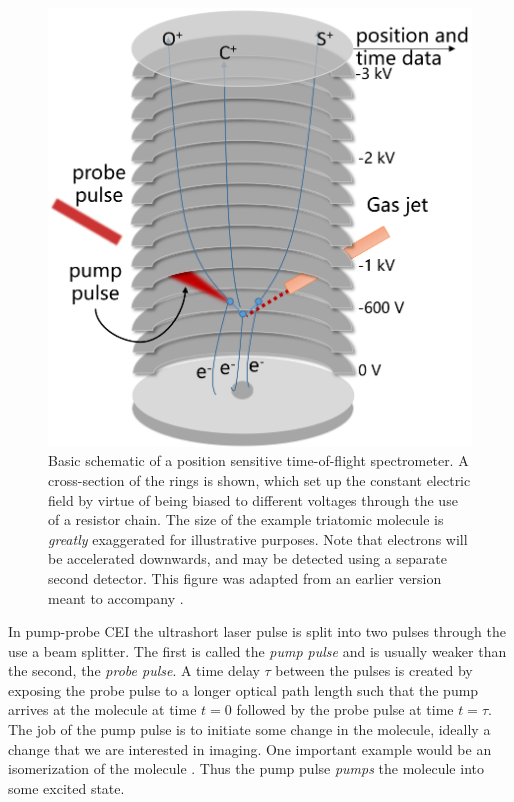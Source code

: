 \begin{figure}
  \centering
  \includegraphics[width=\textwidth]{gfx/SpectrometerLaser}
  \caption[Basic schematic of a position sensitive time-of-flight spectrometer.]
  {Basic schematic of a position sensitive time-of-flight spectrometer. A cross-section of the rings is shown, which set up the constant electric field by virtue of being biased to different voltages through the use of a resistor chain. The size of the example triatomic molecule is \emph{greatly} exaggerated for illustrative purposes. Note that electrons will be accelerated downwards, and may be detected using a separate second detector. This figure was adapted from an earlier version meant to accompany \citet{Ramadhan16}.}
  \label{fig:spectrometer}
\end{figure}

In pump-probe CEI the ultrashort laser pulse is split into two pulses through the use a beam splitter. The first is called the \emph{pump pulse} and is usually weaker than the second, the \emph{probe pulse}. A time delay $\tau$ between the pulses is created by exposing the probe pulse to a longer optical path length such that the pump arrives at the molecule at time $t=0$ followed by the probe pulse at time $t=\tau$. The job of the pump pulse is to initiate some change in the molecule, ideally a change that we are interested in imaging. One important example would be an isomerization of the molecule \citep{Ibrahim14,Liekhus-Schmaltz15}. Thus the pump pulse \emph{pumps} the molecule into some excited state.

